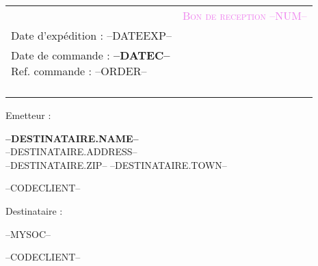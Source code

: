 \newcommand{\FOOT}{--FOOT--}



\newcommand{\specialcell}[2][c]{
	\parbox[#1]{8.3cm}{#2}}

\begin{tabular}{p{9cm} p{8cm}}
    \vspace{0pt} 
    & 
    \vspace{0pt}
   \raggedleft
	\textcolor{violet}{\textsc{\Large Bon de reception --NUM--}}\\
	Date d'exp\'edition : --DATEEXP--\\
    {\small Date de commande : \textbf{--DATEC--}\\
	Ref. commande : --ORDER--\\}~\\
\end{tabular}


\begin{minipage}[t]{0.40\textwidth}
{\small Emetteur :}\\
\begin{fminipage}
\textbf{\large --DESTINATAIRE.NAME--}\\
--DESTINATAIRE.ADDRESS--\\
\textsc{--DESTINATAIRE.ZIP-- --DESTINATAIRE.TOWN--}\\
\begin{minipage}{\textwidth}
\flushright
{\tiny --CODECLIENT--}
\end{minipage}
\end{fminipage}
\end{minipage}
\hspace{1cm}
\begin{minipage}[t]{0.52\textwidth}
{\small Destinataire :}

\begin{fminipage}
--MYSOC--\\
\begin{minipage}{\textwidth}
\flushright
{\tiny --CODECLIENT--}
\end{minipage}
\end{fminipage}
\end{minipage}


